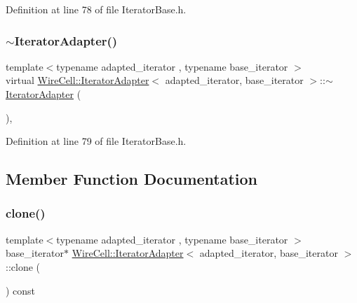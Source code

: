 Definition at line 78 of file Iterator\+Base.\+h.

\mbox{\label{class_wire_cell_1_1_iterator_adapter_adeab5caf488dab6b0cdb1dc48ccccb53}} 
\subsubsection{\texorpdfstring{$\sim$\+Iterator\+Adapter()}{~IteratorAdapter()}}
{\footnotesize\ttfamily template$<$typename adapted\+\_\+iterator , typename base\+\_\+iterator $>$ \\
virtual \hyperlink{class_wire_cell_1_1_iterator_adapter}{Wire\+Cell\+::\+Iterator\+Adapter}$<$ adapted\+\_\+iterator, base\+\_\+iterator $>$\+::$\sim$\hyperlink{class_wire_cell_1_1_iterator_adapter}{Iterator\+Adapter} (\begin{DoxyParamCaption}{ }\end{DoxyParamCaption})\hspace{0.3cm}{\ttfamily [inline]}, {\ttfamily [virtual]}}



Definition at line 79 of file Iterator\+Base.\+h.



\subsection{Member Function Documentation}
\mbox{\label{class_wire_cell_1_1_iterator_adapter_a8716b6af5943b38471e58faaea8cc2c3}} 
\subsubsection{\texorpdfstring{clone()}{clone()}}
{\footnotesize\ttfamily template$<$typename adapted\+\_\+iterator , typename base\+\_\+iterator $>$ \\
base\+\_\+iterator$\ast$ \hyperlink{class_wire_cell_1_1_iterator_adapter}{Wire\+Cell\+::\+Iterator\+Adapter}$<$ adapted\+\_\+iterator, base\+\_\+iterator $>$\+::clone (\begin{DoxyParamCaption}{ }\end{DoxyParamCaption}) const\hspace{0.3cm}{\ttfamily [inline]}}



